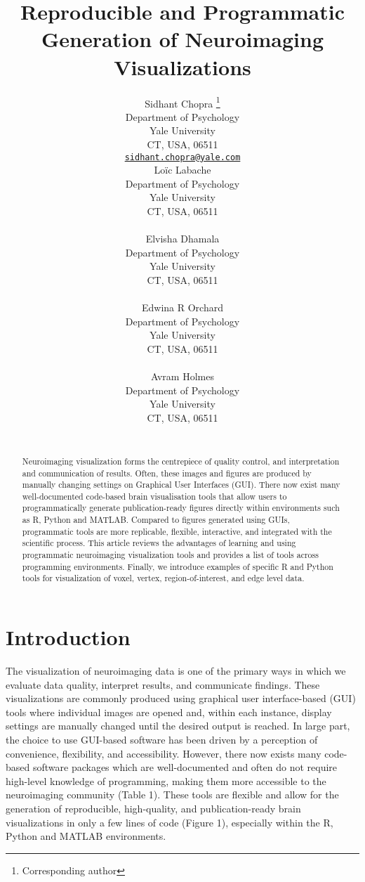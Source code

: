\documentclass{article}
\title{Reproducible and Programmatic Generation of Neuroimaging Visualizations}
\author{
    Sidhant Chopra
    \thanks{Corresponding author}
   \\
    Department of Psychology \\
    Yale University \\
  CT, USA, 06511 \\
  \texttt{\href{mailto:sidhant.chopra@yale.com}{\nolinkurl{sidhant.chopra@yale.com}}} \\
   \And
    Loïc Labache
   \\
    Department of Psychology \\
    Yale University \\
  CT, USA, 06511 \\
  \texttt{} \\
   \And
    Elvisha Dhamala
   \\
    Department of Psychology \\
    Yale University \\
  CT, USA, 06511 \\
  \texttt{} \\
   \And
    Edwina R Orchard
   \\
    Department of Psychology \\
    Yale University \\
  CT, USA, 06511 \\
  \texttt{} \\
   \And
    Avram Holmes
   \\
    Department of Psychology \\
    Yale University \\
  CT, USA, 06511 \\
  \texttt{} \\
  }
\begin{document}
\maketitle


\begin{abstract}
Neuroimaging visualization forms the centrepiece of quality control, and interpretation and communication of results. Often, these images and figures are produced by manually changing settings on Graphical User Interfaces (GUI). There now exist many well-documented code-based brain visualisation tools that allow users to programmatically generate publication-ready figures directly within environments such as R, Python and MATLAB. Compared to figures generated using GUIs, programmatic tools are more replicable, flexible, interactive, and integrated with the scientific process. This article reviews the advantages of learning and using programmatic neuroimaging visualization tools and provides a list of tools across programming environments. Finally, we introduce examples of specific R and Python tools for visualization of voxel, vertex, region-of-interest, and edge level data.
\end{abstract}


\hypertarget{introduction}{%
\section{Introduction}\label{introduction}}

The visualization of neuroimaging data is one of the primary ways in which we evaluate data quality, interpret results, and communicate findings. These visualizations are commonly produced using graphical user interface-based (GUI) tools where individual images are opened and, within each instance, display settings are manually changed until the desired output is reached. In large part, the choice to use GUI-based software has been driven by a perception of convenience, flexibility, and accessibility. However, there now exists many code-based software packages which are well-documented and often do not require high-level knowledge of programming, making them more accessible to the neuroimaging community (Table 1). These tools are flexible and allow for the generation of reproducible, high-quality, and publication-ready brain visualizations in only a few lines of code (Figure 1), especially within the R, Python and MATLAB environments.
\end{document}
